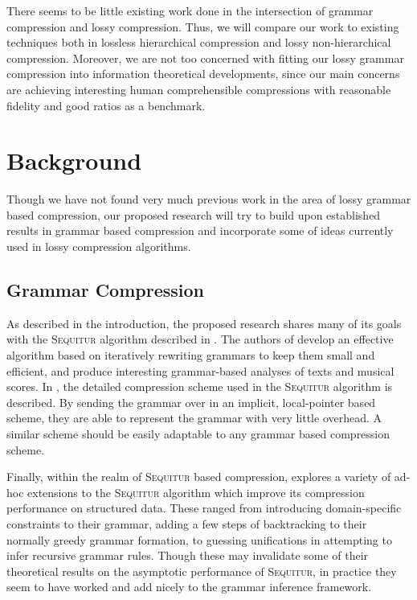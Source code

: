 \documentclass[11pt]{article}
\newcommand{\Sequitur}{\textsc{Sequitur}\xspace}
\begin{document}
There seems to be little existing work done in the intersection of grammar
compression and lossy compression.  Thus, we will compare our work to existing
techniques both in lossless hierarchical compression and lossy non-hierarchical
compression.  Moreover, we are not too concerned with fitting our lossy grammar
compression into information theoretical developments, since our main concerns
are achieving interesting human comprehensible compressions with reasonable
fidelity and good ratios as a benchmark.

\section{Background}

Though we have not found very much previous work in the area of lossy grammar
based compression, our proposed research will try to build upon established
results in grammar based compression and incorporate some of ideas currently
used in lossy compression algorithms.

\subsection{Grammar Compression}

As described in the introduction, the proposed research shares many of its
goals with the \Sequitur algorithm described in \cite{sequitur}.  The authors
of \cite{sequitur} develop an effective algorithm based on iteratively
rewriting grammars to keep them small and efficient, and produce interesting
grammar-based analyses of texts and musical scores.  In \cite{sequitur2}, the
detailed compression scheme used in the \Sequitur algorithm is described.  By
sending the grammar over in an implicit, local-pointer based scheme, they are
able to represent the grammar with very little overhead.  A similar scheme
should be easily adaptable to any grammar based compression scheme.

Finally, within the realm of \Sequitur based compression, \cite{nevillphd}
explores a variety of ad-hoc extensions to the \Sequitur algorithm which
improve its compression performance on structured data.  These ranged from
introducing domain-specific constraints to their grammar, adding a few steps of
backtracking to their normally greedy grammar formation, to guessing
unifications in attempting to infer recursive grammar rules.  Though these may
invalidate some of their theoretical results on the asymptotic performance of
\Sequitur, in practice they seem to have worked and add nicely to the grammar
inference framework.
\end{document}
